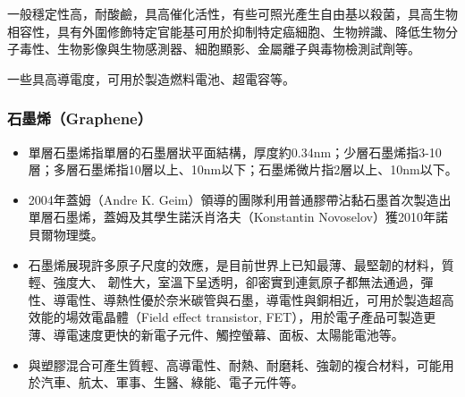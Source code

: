 \documentclass[a4paper,12pt]{report}
\begin{document}
\begin{itemize}
\begin{itemize}
一般穩定性高，耐酸鹼，具高催化活性，有些可照光產生自由基以殺菌，具高生物相容性，具有外圍修飾特定官能基可用於抑制特定癌細胞、生物辨識、降低生物分子毒性、生物影像與生物感測器、細胞顯影、金屬離子與毒物檢測試劑等。

一些具高導電度，可用於製造燃料電池、超電容等。
\subsubsection{石墨烯（Graphene）}
\begin{itemize}
\item 單層石墨烯指單層的石墨層狀平面結構，厚度約0.34nm；少層石墨烯指3-10層；多層石墨烯指10層以上、10nm以下；石墨烯微片指2層以上、10nm以下。
\item 2004年蓋姆（Andre K. Geim）領導的團隊利用普通膠帶沾黏石墨首次製造出單層石墨烯，蓋姆及其學生諾沃肖洛夫（Konstantin Novoselov）獲2010年諾貝爾物理獎。
\item 石墨烯展現許多原子尺度的效應，是目前世界上已知最薄、最堅韌的材料，質輕、強度大、 韌性大，室溫下呈透明，卻密實到連氦原子都無法通過，彈性、導電性、導熱性優於奈米碳管與石墨，導電性與銅相近，可用於製造超高效能的場效電晶體（Field effect transistor, FET），用於電子產品可製造更薄、導電速度更快的新電子元件、觸控螢幕、面板、太陽能電池等。
\item 與塑膠混合可產生質輕、高導電性、耐熱、耐磨耗、強韌的複合材料，可能用於汽車、航太、軍事、生醫、綠能、電子元件等。
\end{itemize}

\end{itemize}
\end{itemize}
\end{document}
